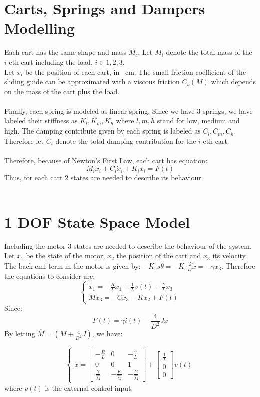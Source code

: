 \section{Carts, Springs and Dampers Modelling}
Each cart has the same shape and mass $M_{c}$. Let $M_{i}$ denote the total mass of the $i$-eth cart including the load, $i \in {1,2,3}$. \\
Let $x_{i}$ be the position of each cart, in \SI{}{\cm}. The small friction coefficient of the sliding guide can be approximated with a viscous friction $C_{s}(M)$ which depends on the mass of the cart plus the load. \\ \\
Finally, each spring is modeled as linear spring. Since we have 3 springs, we have labeled their stiffness as $K_l, K_m, K_h$ where $l,m,h$ stand for low, medium and high. The damping contribute given by each spring is labeled as $C_l, C_m, C_h$. Therefore let $C_{i}$ denote the total damping contribution for the $i$-eth cart.\\ \\
Therefore, because of Newton's First Law, each cart has equation:
$$M_i \ddot{x}_i + C_{i} \dot{x}_i + K_{i}x_{i}=F(t)$$
Thus, for each cart 2 states are needed to describe its behaviour.\\ \\
\section{1 DOF State Space Model}
Including the motor 3 states are needed to describe the behaviour of the system. Let $x_{1}$ be the state of the motor, $x_{2}$ the position of the cart and $x_{3}$ its velocity. The back-emf term in the motor is given by: $-K_e s \theta = -K_e \frac{2}{D}\dot{x} = -\gamma x_3$. Therefore the equations to consider are:
\begin{equation}
\begin{cases}
\dot{x}_1 = -\frac{R}{L}x_{1}+\frac{1}{L} v(t)-\frac{\gamma}{L}x_3  \\
M\dot{x}_3 = -Cx_3 -K x_2 + F(t)
\end{cases}
\end{equation}
Since:
$$F(t)=\gamma i(t) - \frac{4}{D^2}J \ddot{x}$$
By letting $\hat{M} = (M+\frac{4}{D^2}J)$, we have:

\begin{equation}
\begin{cases}
\dot{x}=\begin{bmatrix}
-\frac{R}{L} &0 & -\frac{\gamma}{L} \\
0 & 0 & 1 \\ 
 \frac{\gamma}{\hat{M}} & -\frac{K}{\hat{M}} & -\frac{C}{\hat{M}}
\end{bmatrix}
+
\begin{bmatrix}\frac{1}{L} \\ 0 \\ 0\end{bmatrix} v(t)
\end{cases}
\end{equation}
where $v(t)$ is the external control input.
